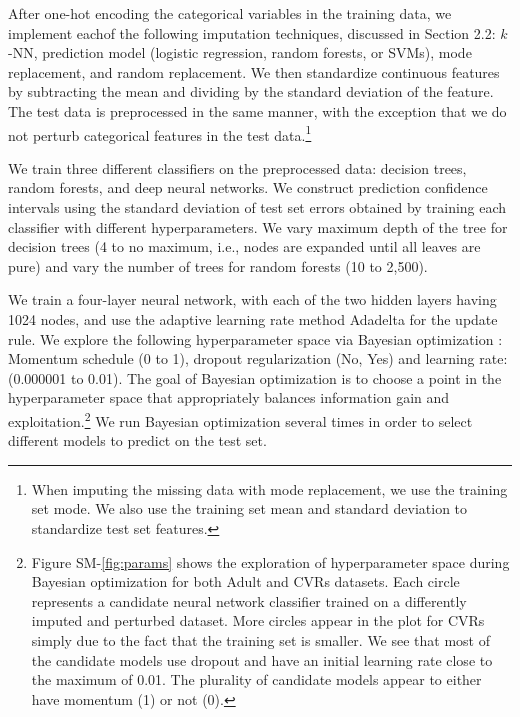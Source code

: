 \documentclass[10pt]{book}
\theoremstyle{definition}
\begin{document}
After one-hot encoding the categorical variables in the training data, we implement eachof the following imputation techniques, discussed in Section 2.2: $k$-NN, prediction model (logistic regression, random forests, or SVMs), mode replacement, and random replacement. We then standardize continuous features by subtracting the mean and dividing by the standard deviation of the feature. The test data is preprocessed in the same manner, with the exception that we do not perturb categorical features in the test data.\footnote{When imputing the missing data with mode replacement, we use the training set mode. We also use the training set mean and standard deviation to standardize test set features.}

\par
{}

We train three different classifiers on the preprocessed data: decision trees, random forests, and deep neural networks. We construct prediction confidence intervals using the standard deviation of test set errors obtained by training each classifier with different hyperparameters. We vary maximum depth of the tree for decision trees  (4 to no maximum, i.e., nodes are expanded until all leaves are pure) and vary the number of trees for random forests (10 to 2,500). 

We train a four-layer neural network, with each of the two hidden layers having 1024 nodes, and use the adaptive learning rate method Adadelta \citep{zeiler2012} for the update rule. We explore the following hyperparameter space via Bayesian optimization \citep{snoek2012}: Momentum schedule (0 to 1), dropout regularization (No, Yes) and learning rate: (0.000001 to 0.01). The goal of Bayesian optimization is to choose a point in the hyperparameter space that appropriately balances information gain and exploitation.\footnote{Figure SM-\ref{fig:params} shows the exploration of hyperparameter space during Bayesian optimization for both Adult and CVRs datasets. Each circle represents a candidate neural network classifier trained on a differently imputed and perturbed dataset. More circles appear in the plot for CVRs simply due to the fact that the training set is smaller. We see that most of the candidate models use dropout and have an initial learning rate close to the maximum of 0.01. The plurality of candidate models appear to either have momentum (1) or not (0).} We run Bayesian optimization several times in order to select different models to predict on the test set. 
\end{document}
